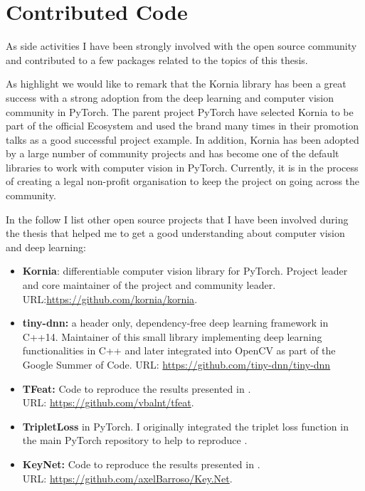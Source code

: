 \section{Contributed Code}

As side activities I have been strongly involved with the open source community and contributed to a few packages related to the topics of this thesis.

As highlight we would like to remark that the Kornia library has been a great success with a strong adoption from the deep learning and computer vision community in PyTorch. The parent project PyTorch have selected Kornia to be part of the official Ecosystem and used the brand many times in their promotion talks as a good successful project example. In addition, Kornia has been adopted by a large number of community projects and has become one of the default libraries to work with computer vision in PyTorch. Currently, it is in the process of creating a legal non-profit organisation to keep the project on going across the community.

In the follow I list other open source projects that I have been involved during the thesis that helped me to get a good understanding about computer vision and deep learning:

\begin{itemize}
\item \textbf{Kornia}: differentiable computer vision library for PyTorch. Project leader and core maintainer of the project and community leader.\\
URL:\url{https://github.com/kornia/kornia}.
\item\textbf{tiny-dnn:} a header only, dependency-free deep learning framework in C++14. Maintainer of this small library implementing deep learning functionalities in C++ and later integrated into OpenCV as part of the Google Summer of Code. URL: \url{https://github.com/tiny-dnn/tiny-dnn}
\item \textbf{TFeat:} Code to reproduce the results presented in \cite{BalntasBMVC2016}.\\
URL: \url{https://github.com/vbalnt/tfeat}.
\item \textbf{TripletLoss} in PyTorch. I originally integrated the triplet loss function in the main PyTorch repository to help to reproduce \cite{BalntasBMVC2016}.
\item \textbf{KeyNet:} Code to reproduce the results presented in \cite{barroso2019keynet}.\\
URL: \url{https://github.com/axelBarroso/Key.Net}.
\end{itemize}

